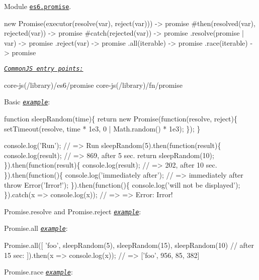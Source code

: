 Module \href{https://github.com/zloirock/core-js/blob/v2.6.0/modules/es6.promise.js}{\tt {\ttfamily es6.\+promise}}. 
\begin{DoxyCode}
new Promise(executor(resolve(var), reject(var))) -> promise
  #then(resolved(var), rejected(var))            -> promise
  #catch(rejected(var))                          -> promise
  .resolve(promise | var)                        -> promise
  .reject(var)                                   -> promise
  .all(iterable)                                 -> promise
  .race(iterable)                                -> promise
\end{DoxyCode}
 \href{#commonjs}{\tt {\itshape Common\+JS entry points\+:}} 
\begin{DoxyCode}
core-js(/library)/es6/promise
core-js(/library)/fn/promise
\end{DoxyCode}
 Basic \href{http://goo.gl/vGrtUC}{\tt {\itshape example}}\+: 
\begin{DoxyCode}
function sleepRandom(time)\{
  return new Promise(function(resolve, reject)\{
    setTimeout(resolve, time * 1e3, 0 | Math.random() * 1e3);
  \});
\}

console.log('Run');                    // => Run
sleepRandom(5).then(function(result)\{
  console.log(result);                 // => 869, after 5 sec.
  return sleepRandom(10);
\}).then(function(result)\{
  console.log(result);                 // => 202, after 10 sec.
\}).then(function()\{
  console.log('immediately after');    // => immediately after
  throw Error('Irror!');
\}).then(function()\{
  console.log('will not be displayed');
\}).catch(x => console.log(x));         // => => Error: Irror!
\end{DoxyCode}
 {\ttfamily Promise.\+resolve} and {\ttfamily Promise.\+reject} \href{http://goo.gl/vr8TN3}{\tt {\itshape example}}\+: 
 {\ttfamily Promise.\+all} \href{http://goo.gl/RdoDBZ}{\tt {\itshape example}}\+: 
\begin{DoxyCode}
Promise.all([
  'foo',
  sleepRandom(5),
  sleepRandom(15),
  sleepRandom(10)             // after 15 sec:
]).then(x => console.log(x)); // => ['foo', 956, 85, 382]
\end{DoxyCode}
 {\ttfamily Promise.\+race} \href{http://goo.gl/L8ovkJ}{\tt {\itshape example}}\+: 

